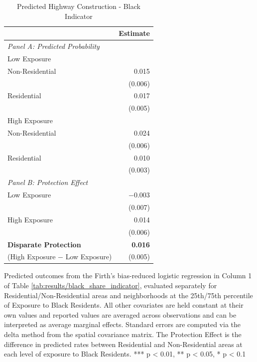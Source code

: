 \begin{table}[h]
\centering
\caption{Predicted Highway Construction - Black Indicator}
\label{tab:predicted_outcomes/black_share}
\begin{threeparttable}
\begin{tabular*}{1\textwidth}{@{\extracolsep{\fill}}lr@{\hspace{1.2em}}}
\toprule
 & Estimate \\
\midrule
\textit{Panel A: Predicted Probability} & \\
\addlinespace[2pt]
Low Exposure & \\
\quad Non-Residential & 0.015 \\
 & (0.006) \\[4pt]
\quad Residential & 0.017 \\
 & (0.005) \\[4pt]
High Exposure & \\
\quad Non-Residential & 0.024 \\
 & (0.006) \\[4pt]
\quad Residential & 0.010 \\
 & (0.003) \\[4pt]
\midrule
\textit{Panel B: Protection Effect} & \\
\addlinespace[2pt]
Low Exposure & $-$0.003 \\
 & (0.007) \\[4pt]
High Exposure & 0.014\rlap{$^{**}$} \\
 & (0.006) \\[4pt]
\addlinespace[2pt]
\textbf{Disparate Protection} & \textbf{0.016}\rlap{$^{***}$} \\
(High Exposure $-$ Low Exposure) & (0.005) \\
\bottomrule
\end{tabular*}
\begin{tablenotes}[flushleft]
\footnotesize
\item Predicted outcomes from the Firth's bias-reduced logistic regression in Column 1 of Table \ref{tab:results/black_share_indicator}, evaluated separately for Residential/Non-Residential areas and neighborhoods at the 25th/75th percentile of Exposure to Black Residents. All other covariates are held constant at their own values and reported values are averaged across observations and can be interpreted as average marginal effects. Standard errors are computed via the delta method from the spatial covariance matrix. The Protection Effect is the difference in predicted rates between Residential and Non-Residential areas at each level of exposure to Black Residents. *** p < 0.01, ** p < 0.05, * p < 0.1
\end{tablenotes}
\end{threeparttable}
\end{table}
